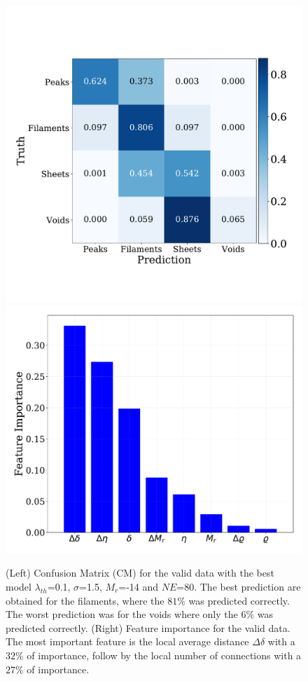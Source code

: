 \documentclass[usenatbib]{mnras}
\begin{document}
\begin{figure}
\centering
    \includegraphics[scale=0.32]{Figs/p_confusion_matrix_valid.pdf}
    \includegraphics[scale=0.28]{Figs/p_features_importance_valid.pdf}  
    \caption{(Left) Confusion Matrix (CM) for the valid data with the
      best model $\lambda_{th}$=0.1, $\sigma$=1.5, $M_r$=-14 and
      $NE$=80. The best prediction are obtained for the 
      filaments, where the $81\%$ was predicted correctly. The worst
      prediction was for the voids where only the $6\%$ was predicted 
      correctly.
      (Right) Feature importance for the valid data. The most
      important feature is the local average distance $\Delta\delta$
      with a $32\%$ of importance, follow by the local number of
      connections with a $27\%$ of importance.}  
    \label{fig:confusion_matrix_valid}
\end{figure}
\end{document}
